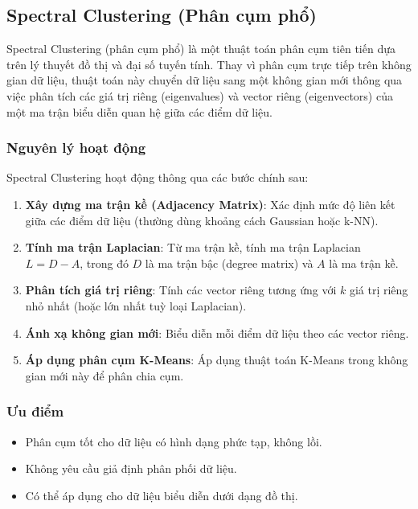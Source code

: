 \subsection {Spectral Clustering (Phân cụm phổ)}
\label{label:SpectralClustering}

Spectral Clustering (phân cụm phổ) \cite{868688} là một thuật toán phân cụm tiên tiến dựa trên lý thuyết đồ thị và đại số tuyến tính. Thay vì phân cụm trực tiếp trên không gian dữ liệu, thuật toán này chuyển dữ liệu sang một không gian mới thông qua việc phân tích các giá trị riêng (eigenvalues) và vector riêng (eigenvectors) của một ma trận biểu diễn quan hệ giữa các điểm dữ liệu.

\subsubsection*{Nguyên lý hoạt động}

Spectral Clustering hoạt động thông qua các bước chính sau:

\begin{enumerate}
    \item \textbf{Xây dựng ma trận kề (Adjacency Matrix)}: Xác định mức độ liên kết giữa các điểm dữ liệu (thường dùng khoảng cách Gaussian hoặc k-NN).
    \item \textbf{Tính ma trận Laplacian}: Từ ma trận kề, tính ma trận Laplacian $L = D - A$, trong đó $D$ là ma trận bậc (degree matrix) và $A$ là ma trận kề.
    \item \textbf{Phân tích giá trị riêng}: Tính các vector riêng tương ứng với $k$ giá trị riêng nhỏ nhất (hoặc lớn nhất tuỳ loại Laplacian).
    \item \textbf{Ánh xạ không gian mới}: Biểu diễn mỗi điểm dữ liệu theo các vector riêng.
    \item \textbf{Áp dụng phân cụm K-Means}: Áp dụng thuật toán K-Means trong không gian mới này để phân chia cụm.
\end{enumerate}

\subsubsection*{Ưu điểm}
\begin{itemize}
    \item Phân cụm tốt cho dữ liệu có hình dạng phức tạp, không lồi.
    \item Không yêu cầu giả định phân phối dữ liệu.
    \item Có thể áp dụng cho dữ liệu biểu diễn dưới dạng đồ thị.
\end{itemize}

